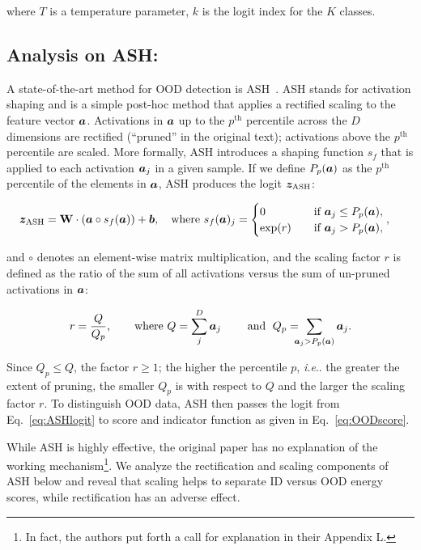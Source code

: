 \documentclass{article} %
\makeatletter
\theoremstyle{plain}
\DeclareRobustCommand\onedot{\futurelet\@let@token\@onedot}
\def\@onedot{\ifx\@let@token.\else.\null\fi\xspace}
\def\ie{\emph{i.e}\onedot} \def\Ie{\emph{I.e}\onedot}
\newcommand{\logit}{\vz}  %
\newcommand{\pF}{\va}     %
\makeatother
\begin{document}
where $T$ is a temperature parameter, $k$ is the logit index for the $K$ classes. 



\subsection{Analysis on ASH:}\label{sec:analysis}
A state-of-the-art method for OOD detection is ASH~\citep{DBLP:conf/iclr/DjurisicBAL23/ASH}. ASH stands for activation shaping and is a simple post-hoc method that applies a rectified scaling to the feature vector $\pF$. Activations in $\pF$ up to the $p^{\text{th}}$ percentile across the $D$ dimensions are rectified (``pruned'' in the original text); activations above the $p^{\text{th}}$ percentile are scaled.  More formally, ASH introduces a shaping function $s_f$ that is applied to each activation $\pF_j$ in a given sample.  If we define $P_{p}(\pF)$ as the $p^{\text{th}}$ percentile of the elements in $\pF$, ASH produces the logit $\logit_{\text{ASH}}$:   

\begin{equation}\label{eq:ASHlogit}
    \logit_{\text{ASH}} = \mathbf{W} \cdot \left(\pF \circ s_f(\pF)\right) + \vb, \quad \text{where } s_f (\pF)_j = \begin{cases}
0 & \quad \text{if } \pF_j \leq P_{p}(\pF), \\
\exp(r) & \quad \text{if } \pF_j > P_{p}(\pF),
\end{cases}, \quad 
\end{equation}

and $\circ$ denotes an element-wise matrix multiplication, and the scaling factor $r$ is defined as the ratio of the sum of all activations versus the sum of un-pruned activations in $\pF$:

\begin{equation}\label{eq:scalefactor}
    r = \frac{Q}{Q_p}, \qquad \text{where } Q = {\sum_{j}^{D}{\va_j}} \qquad \text{ and }\; Q_p = \!\!\!\! \sum_{\va_j>P_{p}(\pF)}{\va_j}.
\end{equation}

Since $Q_p\leq Q$, the factor $r \geq 1$; the higher the percentile $p$, \ie the greater the extent of pruning, the smaller $Q_p$ is with respect to $Q$ and the larger the scaling factor $r$.  To distinguish OOD data, ASH then passes the logit from Eq.~\ref{eq:ASHlogit} to score and indicator function as given in Eq.~\ref{eq:OODscore}.




While ASH is highly effective, the original paper has no explanation of the working mechanism\footnote{In fact, the authors put forth a call for explanation in their Appendix L.}. We analyze the rectification and scaling components of ASH below and reveal that scaling helps to separate ID versus OOD energy scores, while rectification has an adverse effect. 
\end{document}
